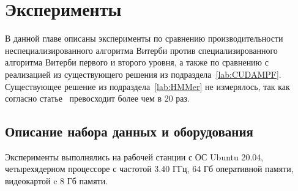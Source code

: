 \section{Эксперименты}
В данной главе описаны эксперименты по сравнению 
производительности неспециализированного алгоритма Витерби 
против специализированного алгоритма Витерби первого и второго уровня,
а также по сравнению с реализацией из существующего решения  из 
подраздела~\ref{lab:CUDAMPF}.
Существующее решение  из подраздела~\ref{lab:HMMer} не измерялось, так как согласно статье~\cite{cudampf}  превосходит  более чем в 20 раз.

\subsection{Описание набора данных и оборудования}
Эксперименты выполнялись на рабочей станции с ОС Ubuntu 
20.04, четырехядерном процессоре  с частотой 3.40 ГГц, 64 Гб оперативной памяти, видеокартой 
 c 8 Гб памяти.

